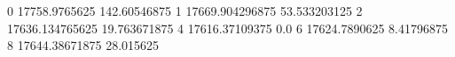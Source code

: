 0 17758.9765625 142.60546875
1 17669.904296875 53.533203125
2 17636.134765625 19.763671875
4 17616.37109375 0.0
6 17624.7890625 8.41796875
8 17644.38671875 28.015625

